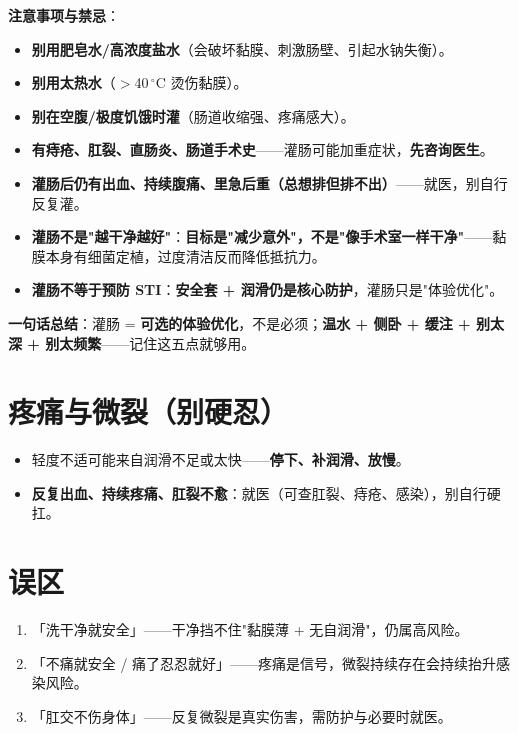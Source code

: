 \documentclass[12pt,UTF8,openany]{ctexbook}
\begin{document}
\noindent\textbf{注意事项与禁忌}：
\begin{itemize}[leftmargin=2em,itemsep=0.3em]
  \item \textbf{别用肥皂水/高浓度盐水}（会破坏黏膜、刺激肠壁、引起水钠失衡）。
  \item \textbf{别用太热水}（$>$40\,$^\circ$C 烫伤黏膜）。
  \item \textbf{别在空腹/极度饥饿时灌}（肠道收缩强、疼痛感大）。
  \item \textbf{有痔疮、肛裂、直肠炎、肠道手术史}——灌肠可能加重症状，\textbf{先咨询医生}。
  \item \textbf{灌肠后仍有出血、持续腹痛、里急后重（总想排但排不出）}——就医，别自行反复灌。
  \item \textbf{灌肠不是"越干净越好"}：\textbf{目标是"减少意外"，不是"像手术室一样干净"}——黏膜本身有细菌定植，过度清洁反而降低抵抗力。
  \item \textbf{灌肠不等于预防 STI}：\textbf{安全套 + 润滑仍是核心防护}，灌肠只是"体验优化"。
\end{itemize}

\noindent\textbf{一句话总结}：灌肠 = \textbf{可选的体验优化}，不是必须；\textbf{温水 + 侧卧 + 缓注 + 别太深 + 别太频繁}——记住这五点就够用。

\section{疼痛与微裂（别硬忍）}

\begin{itemize}[leftmargin=2em,itemsep=0.3em]
  \item 轻度不适可能来自润滑不足或太快——\textbf{停下、补润滑、放慢}。
  \item \textbf{反复出血、持续疼痛、肛裂不愈}：就医（可查肛裂、痔疮、感染），别自行硬扛。
\end{itemize}

\section{误区}

\begin{enumerate}[leftmargin=2em,itemsep=0.3em]
  \item 「洗干净就安全」——干净挡不住"黏膜薄 + 无自润滑"，仍属高风险。
  \item 「不痛就安全 / 痛了忍忍就好」——疼痛是信号，微裂持续存在会持续抬升感染风险。
  \item 「肛交不伤身体」——反复微裂是真实伤害，需防护与必要时就医。
\end{enumerate}
\end{document}
